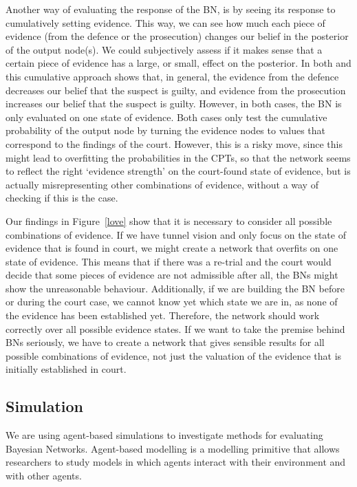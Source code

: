 \documentclass[11pt]{article}
\begin{document}
\begin{enumerate}
Another way of evaluating the response of the BN, is by seeing its response to cumulatively setting evidence. This way, we can see how much each piece of evidence (from the defence or the prosecution) changes our belief in the posterior of the output node(s). We could subjectively assess if it makes sense that a certain piece of evidence has a large, or small, effect on the posterior. In both \citep{Fenton2019} and \citep{vlek2016} this cumulative approach shows that, in general, the evidence from the defence decreases our belief that the suspect is guilty, and evidence from the prosecution increases our belief that the suspect is guilty. However, in both cases, the BN is only evaluated on one state of evidence. Both cases only test the cumulative probability of the output node by turning the evidence nodes to values that correspond to the findings of the court. However, this is a risky move, since this might lead to overfitting the probabilities in the CPTs, so that the network seems to reflect the right `evidence strength' on the court-found state of evidence, but is actually misrepresenting other combinations of evidence, without a way of checking if this is the case.




\end{enumerate}


Our findings in Figure~\ref{love} show that it is necessary to consider all possible combinations of evidence. If we have tunnel vision and only focus on the state of evidence that is found in court, we might create a network that overfits on one state of evidence. This means that if there was a re-trial and the court would decide that some pieces of evidence are not admissible after all, the BNs might show the unreasonable behaviour. Additionally, if we are building the BN before or during the court case, we cannot know yet which state we are in, as none of the evidence has been established yet. Therefore, the network should work correctly over all possible evidence states. If we want to take the premise behind BNs seriously, we have to create a network that gives sensible results for all possible combinations of evidence, not just the valuation of the evidence that is initially established in court.

\subsection{Simulation}

We are using agent-based simulations to investigate methods for evaluating Bayesian Networks. Agent-based modelling is a modelling primitive that allows researchers to study models in which agents interact with their environment and with other agents\citep{gilbert2000}. 
\end{document}
